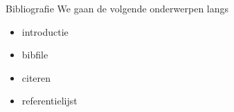 
\begin{frame}{Bibliografie}
    We gaan de volgende onderwerpen langs
    \begin{itemize}[label=\textbullet]
        \item introductie
        \item bibfile
        \item citeren 
        \item referentielijst
    \end{itemize}
\end{frame}